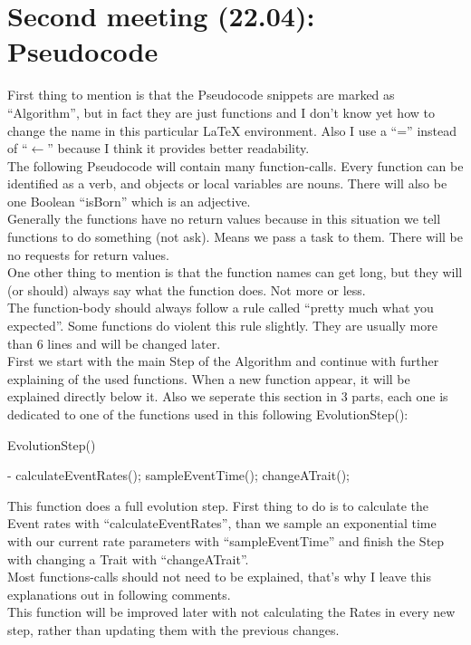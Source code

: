 \documentclass{article}
\begin{document}
\section{Second meeting (22.04): Pseudocode}
First thing to mention is that the Pseudocode snippets are marked as "`Algorithm"', but in fact they are just functions and I don’t know yet how to change the name in this particular LaTeX environment. Also I use a "`="' instead of "`$\leftarrow$"' because I think it provides better readability.\\
The following Pseudocode will contain many function-calls. Every function can be identified as a verb, and objects or local variables are nouns. There will also be one Boolean "`isBorn"' which is an adjective.\\
Generally the functions have no return values because in this situation we tell functions to do something (not ask). Means we pass a task to them. There will be no requests for return values.\\
One other thing to mention is that the function names can get long, but they will (or should) always say what the function does. Not more or less.\\
The function-body should always follow a rule called "`pretty much what you expected"'. Some functions do violent this rule slightly. They are usually more than 6 lines and will be changed later.\\
First we start with the main Step of the Algorithm and continue with further explaining of the used functions. When a new function appear, it will be explained directly below it. Also we seperate this section in 3 parts, each one is dedicated to one of the functions used in this following EvolutionStep():
\begin{algorithm}[H]
	\caption{EvolutionStep()}
	\begin{algorithmic}[1]
		\REQUIRE -
		\STATE calculateEventRates();
		\STATE sampleEventTime();
		\STATE changeATrait();
	\end{algorithmic}
\end{algorithm}
This function does a full evolution step. First thing to do is to calculate the Event rates with "`calculateEventRates"', than we sample an exponential time with our current rate parameters with "`sampleEventTime"' and finish the Step with changing a Trait with "`changeATrait"'. \\
Most functions-calls should not need to be explained, that’s why I leave this explanations out in following comments.\\
This function will be improved later with not calculating the Rates in every new step, rather than updating them with the previous changes. \\
	
\end{document}
